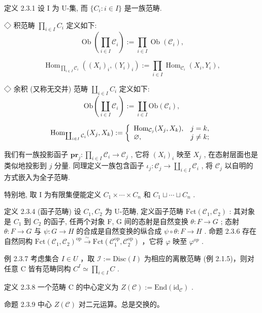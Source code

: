 \documentclass[]{article}
\begin{document}
定义 2.3.1 设 I 为 U-集, 而 $\{C_{i}: i \in I\}$ 是一族范畴. 

◇ 积范畴 $\prod_{i\in I}C_{i}$ 定义如下:$$
\operatorname{Ob} \left(\prod_ {i \in I} \mathcal {C} _ {i}\right) := \prod_ {i \in I} \operatorname{Ob} (\mathcal {C} _ {i}),
$$

$$
\operatorname{Hom} _ {\prod_ {i \in I} \mathcal {C} _ {i}} ((X _ {i}) _ {i}, (Y _ {i}) _ {i}) := \prod_ {i \in I} \operatorname{Hom} _ {\mathcal {C} _ {i}} (X _ {i}, Y _ {i}),
$$

◇ 余积 (又称无交并) 范畴 $\coprod_{i\in I}C_{i}$ 定义如下:$$
\mathrm{Ob} \left(\coprod_ {i \in I} \mathcal {C} _ {i}\right) := \coprod_ {i \in I} \mathrm{Ob} (\mathcal {C} _ {i}),
$$

$$
\mathrm{Hom} _ {\coprod_ {i \in I} \mathcal {C} _ {i}} (X _ {j}, X _ {k}) := \left\{ \begin{array}{l l} \mathrm{Hom} _ {\mathcal {C} _ {j}} (X _ {j}, X _ {k}), & j = k, \\ \varnothing , & j \neq k; \end{array} \right.
$$

我们有一族投影函子 $\mathbf{pr}_j: \prod_{i \in I} \mathcal{C}_i \to \mathcal{C}_j$ , 它将 $(X_i)_i$ 映至 $X_j$ , 在态射层面也是类似地投影到 $j$ 分量. 同理定义一族包含函子 $\iota_j: \mathcal{C}_j \to \coprod_{i \in I} \mathcal{C}_i$ , 将 $\mathcal{C}_j$ 以自明的方式嵌入为全子范畴. 


特别地, 取 I 为有限集便能定义 $C_{1} \times \cdots \times C_{n}$ 和 $C_{1} \sqcup \cdots \sqcup C_{n}$ . 

定义 2.3.4 (函子范畴) 设 $C_{1}, C_{2}$ 为 U-范畴, 定义函子范畴 $\mathrm{Fct}(\mathcal{C}_{1}, \mathcal{C}_{2})$ : 其对象是 $C_{1}$ 到 $C_{2}$ 的函子, 任两个对象 F, G 间的态射是自然变换 $\theta: F \to G$ ; 态射 $\theta: F \to G$ 与 $\psi: G \to H$ 的合成是自然变换的纵合成 $\psi \circ \theta: F \to H$ .   
命题 2.3.6 存在自然同构 $\mathrm{Fct}(\mathcal{C}_{1},\mathcal{C}_{2})^{\mathrm{op}}\stackrel{\sim}{\rightarrow}\mathrm{Fct}(\mathcal{C}_{1}^{\mathrm{op}},\mathcal{C}_{2}^{\mathrm{op}})$ ，它将 $\varphi$ 映至 $\varphi^{op}$ . 

例 2.3.7 考虑集合 $I \in U$ ，取 $\mathcal{I} := \text{Disc}(I)$ 为相应的离散范畴 (例 2.1.5)，则对任意 C 皆有范畴同构 $C^{I} \simeq \prod_{i \in I} C$ . 

定义 2.3.8 一个范畴 C 的中心定义为 $Z(\mathcal{C}) := \text{End}(\text{id}_{\mathcal{C}})$ . 

命题 2.3.9 中心 $Z(\mathcal{C})$ 对二元运算。总是交换的。 
\end{document}
